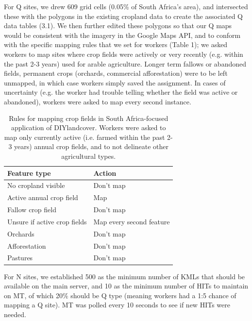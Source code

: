 \documentclass[preprint,12pt,authoryear]{elsarticle}
\begin{document}
For Q sites, we drew 609 grid cells (0.05\% of South Africa's area), and intersected these with the polygons in the existing cropland data to create the associated Q data tables (3.1). We then further edited these polygons so that our Q maps would be consistent with the imagery in the Google Maps API, and to conform with the specific mapping rules that we set for workers (Table 1); we asked workers to map sites where crop fields were actively or very recently (e.g. within the past 2-3 years) used for arable agriculture. Longer term fallows or abandoned fields, permanent crops (orchards, commercial afforestation) were to be left unmapped, in which case workers simply saved the assignment. In cases of uncertainty (e.g. the worker had trouble telling whether the field was active or abandoned), workers were asked to map every second instance.  

\begin{table}[htdp]
  \caption{Rules for mapping crop fields in South Africa-focused application of DIYlandcover. Workers were asked to map only currently active (i.e. farmed within the past 2-3 years) annual crop fields, and to not delineate other agricultural types.}
   \begin{center}  
   \begin{tabular}{l|l}
      \hline
      \textbf{Feature type} & \textbf{Action} \\
      \hline\hline
      No cropland visible & Don't map \\
      Active annual crop field & Map \\
      Fallow crop field & Don't map \\
      Unsure if active crop fields & Map every second feature \\
      Orchards & Don't map \\
      Afforestation & Don't map \\
      Pastures & Don't map \\
     \hline
  \end{tabular}
  \end{center}
  \label{default}
\end{table}%

For N sites, we established 500 as the minimum number of KMLs that should be available on the main server, and 10 as the minimum number of HITs to maintain on MT, of which 20\% should be Q type (meaning workers had a 1:5 chance of mapping a Q site). MT was polled every 10 seconds to see if new HITs were needed.   
\end{document}
